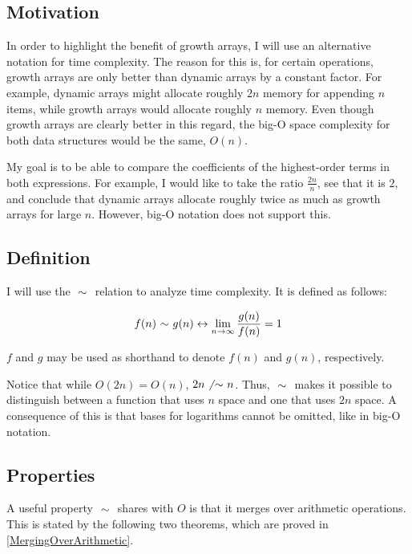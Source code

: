 \subsection{Motivation}

In order to highlight the benefit of growth arrays, I will use an alternative notation for time complexity. The reason for this is, for certain operations, growth arrays are only better than dynamic arrays by a constant factor. For example, dynamic arrays might allocate roughly $2n$ memory for appending $n$ items, while growth arrays would allocate roughly $n$ memory. Even though growth arrays are clearly better in this regard, the big-O space complexity for both data structures would be the same, $O(n)$.

My goal is to be able to compare the coefficients of the highest-order terms in both expressions. For example, I would like to take the ratio $\frac{2n}{n}$, see that it is $2$, and conclude that dynamic arrays allocate roughly twice as much as growth arrays for large $n$. However, big-O notation does not support this.

\subsection{Definition}

I will use the $\ \mathtt{\sim}\ $ relation to analyze time complexity. It is defined as follows:

\begin{align*}
f(n) \ \mathtt{\sim}\  g(n) \leftrightarrow \lim_{n \to \infty} \frac{g(n)}{f(n)} = 1
\end{align*}

$f$ and $g$ may be used as shorthand to denote $f(n)$ and $g(n)$, respectively.

Notice that while $O(2n) = O(n)$, $2n \not\ \mathtt{\sim}\  n$. Thus, $\ \mathtt{\sim}\ $ makes it possible to distinguish between a function that uses $n$ space and one that uses $2n$ space. \HdrNote A consequence of this is that bases for logarithms cannot be omitted, like in big-O notation.

\subsection{Properties}
\label{AsymptoticProperties}

A useful property $\ \mathtt{\sim}\ $ shares with $O$ is that it merges over arithmetic operations. This is stated by the following two theorems, which are proved in \ref{MergingOverArithmetic}.

